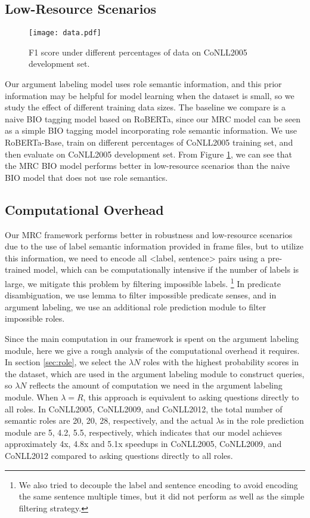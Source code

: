 \documentclass[11pt]{article}
\begin{document}
\subsection{Low-Resource Scenarios}
\begin{figure}
    \centering
    \texttt{[image: data.pdf]}
    \caption{F1 score under different percentages of data on CoNLL2005 development set.}
    \label{fig:data}
\end{figure}
Our argument labeling model uses role semantic information, and this prior information may be helpful for model learning when the dataset is small, so we study the effect of different training data sizes. The baseline we compare is a naive BIO tagging model based on RoBERTa, since our MRC model can be seen as a simple BIO tagging model incorporating role semantic information. We use RoBERTa-Base, train on different percentages of CoNLL2005 training set, and then evaluate on CoNLL2005 development set. From Figure \ref{fig:data}, we can see that the MRC BIO model performs better in low-resource scenarios than the naive BIO model that does not use role semantics.

\subsection{Computational Overhead}
Our MRC framework performs better in robustness and low-resource scenarios due to the use of label semantic information provided in frame files, but to utilize this information, we need to encode all <label, sentence> pairs using a pre-trained model, which can be computationally intensive if the number of labels is large, we mitigate this problem by filtering impossible labels.
\footnote{We also tried to decouple the label and sentence encoding to avoid encoding the same sentence multiple times, but it did not perform as well as the simple filtering strategy.}
In predicate disambiguation, we use lemma to filter impossible predicate senses, and in argument labeling, we use an additional role prediction module to filter impossible roles. 
\par
Since the main computation in our framework is spent on the argument labeling module, here we give a rough analysis of the computational overhead it requires.
In section \ref{sec:role}, we select the $\lambda N$ roles with the highest probability scores in the dataset, which are used in the argument labeling module to construct queries, so $\lambda N$ reflects the amount of computation we need in the argument labeling module. When $\lambda=R$, this approach is equivalent to asking questions directly to all roles. In CoNLL2005, CoNLL2009, and CoNLL2012, the total number of semantic roles are 20, 20, 28, respectively, and the actual $\lambda$s in the role prediction module are 5, 4.2, 5.5, respectively, 
which indicates that our model achieves approximately 4x, 4.8x and 5.1x speedups in CoNLL2005, CoNLL2009, and CoNLL2012 compared to asking questions directly to all roles.
\end{document}
